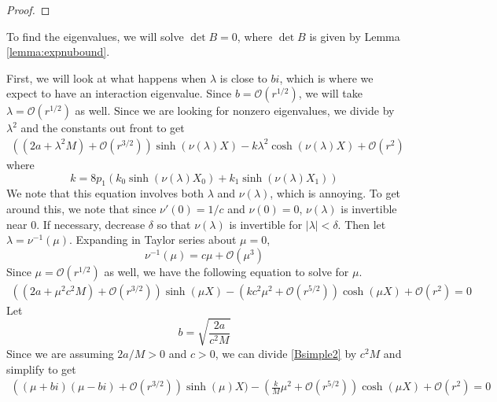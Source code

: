 \documentclass[thesis.tex]{subfiles}
\begin{document}
\begin{lemma}
\begin{proof}
\end{proof}
\end{lemma}

To find the eigenvalues, we will solve $\det B = 0$, where $\det B$ is given by Lemma \cref{lemma:expnubound}. 

First, we will look at what happens when $\lambda$ is close to $bi$, which is where we expect to have an interaction eigenvalue. Since $b = \mathcal{O}(r^{1/2})$, we will take $\lambda = \mathcal{O}(r^{1/2})$ as well. Since we are looking for nonzero eigenvalues, we divide by $\lambda^2$ and the constants out front to get
\begin{equation}\label{Bsimple1}
\begin{aligned}
\left((2a + \lambda^2 M) +  \mathcal{O}( r^{3/2} )\right) \sinh(\nu(\lambda)X) - k \lambda^2 \cosh(\nu(\lambda)X)+ \mathcal{O}( r^2 ) 
\end{aligned}
\end{equation}
where
\begin{equation}\label{2pdefk}
k = 8 p_1 ( k_0\sinh(\nu(\lambda)X_0) + k_1 \sinh(\nu(\lambda)X_1) ) 
\end{equation}
We note that this equation involves both $\lambda$ and $\nu(\lambda)$, which is annoying. To get around this, we note that since $\nu'(0) = 1/c$ and $\nu(0) = 0$, $\nu(\lambda)$ is invertible near 0. If necessary, decrease $\delta$ so that $\nu(\lambda)$ is invertible for $|\lambda| < \delta$. Then let $\lambda = \nu^{-1}(\mu)$. Expanding in Taylor series about $\mu = 0$, 
\[
\nu^{-1}(\mu) = c \mu + \mathcal{O}(\mu^3)
\]
Since $\mu = \mathcal{O}(r^{1/2})$ as well, we have the following equation to solve for $\mu$.
\begin{equation}\label{Bsimple2}
\begin{aligned}
\left((2a + \mu^2 c^2 M) +  \mathcal{O}( r^{3/2} )\right) \sinh(\mu X) - \left(k c^2 \mu^2 + \mathcal{O}( r^{5/2} ) \right)\cosh(\mu X)+ \mathcal{O}( r^2 ) = 0
\end{aligned}
\end{equation}
Let
\[
b = \sqrt{\frac{2a}{c^2 M}}
\]
Since we are assuming $2a/M > 0$ and $c>0$, we can divide \cref{Bsimple2} by $c^2 M$ and simplify to get
\begin{equation}\label{Bsimple2}
\begin{aligned}
\left((\mu + b i)(\mu - b i) +  \mathcal{O}( r^{3/2} )\right) \sinh(\mu )X) - \left(\frac{k}{M} \mu^2 + \mathcal{O}( r^{5/2} ) \right)\cosh(\mu X)+ \mathcal{O}( r^2 ) = 0
\end{aligned}
\end{equation}
\end{document}
